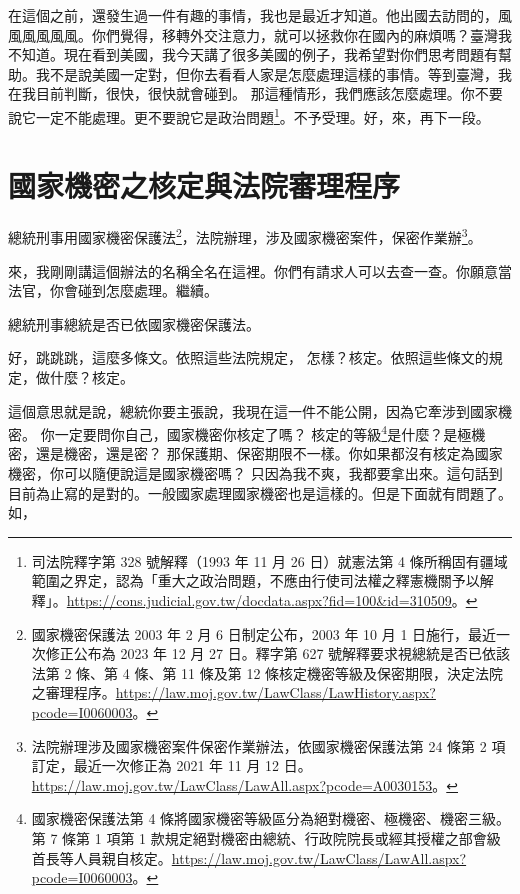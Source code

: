\hypertarget{c11:cue:230}{}在這個之前，還發生過一件有趣的事情，我也是最近才知道。他出國去訪問的，風風風風風風。你們覺得，移轉外交注意力，就可以拯救你在國內的麻煩嗎？臺灣我不知道。現在看到美國，我今天講了很多美國的例子，我希望對你們思考問題有幫助。我不是說美國一定對，但你去看看人家是怎麼處理這樣的事情。等到臺灣，我在我目前判斷，很快，很快就會碰到。
\hypertarget{c11:cue:231}{}那這種情形，我們應該怎麼處理。你不要說它一定不能處理。更不要說它是政治問題\footnote{司法院釋字第 328 號解釋（1993 年 11 月 26 日）就憲法第 4 條所稱固有疆域範圍之界定，認為「重大之政治問題，不應由行使司法權之釋憲機關予以解釋」。\url{https://cons.judicial.gov.tw/docdata.aspx?fid=100&id=310509}。}。不予受理。好，來，再下一段。

\section{國家機密之核定與法院審理程序}

\hypertarget{c11:cue:232}{}總統刑事用國家機密保護法\footnote{國家機密保護法 2003 年 2 月 6 日制定公布，2003 年 10 月 1 日施行，最近一次修正公布為 2023 年 12 月 27 日。釋字第 627 號解釋要求視總統是否已依該法第 2 條、第 4 條、第 11 條及第 12 條核定機密等級及保密期限，決定法院之審理程序。\url{https://law.moj.gov.tw/LawClass/LawHistory.aspx?pcode=I0060003}。}，法院辦理，涉及國家機密案件，保密作業辦\footnote{法院辦理涉及國家機密案件保密作業辦法，依國家機密保護法第 24 條第 2 項訂定，最近一次修正為 2021 年 11 月 12 日。\url{https://law.moj.gov.tw/LawClass/LawAll.aspx?pcode=A0030153}。}。

\hypertarget{c11:cue:233}{}來，我剛剛講這個辦法的名稱全名在這裡。你們有請求人可以去查一查。你願意當法官，你會碰到怎麼處理。繼續。

\hypertarget{c11:cue:234}{}總統刑事總統是否已依國家機密保護法。

\hypertarget{c11:cue:235}{}好，跳跳跳，這麼多條文。依照這些法院規定，
\hypertarget{c11:cue:236}{}怎樣？核定。依照這些條文的規定，做什麼？核定。

\hypertarget{c11:cue:237}{}這個意思就是說，總統你要主張說，我現在這一件不能公開，因為它牽涉到國家機密。
\hypertarget{c11:cue:238}{}你一定要問你自己，國家機密你核定了嗎？
\hypertarget{c11:cue:239}{}核定的等級\footnote{國家機密保護法第 4 條將國家機密等級區分為絕對機密、極機密、機密三級。第 7 條第 1 項第 1 款規定絕對機密由總統、行政院院長或經其授權之部會級首長等人員親自核定。\url{https://law.moj.gov.tw/LawClass/LawAll.aspx?pcode=I0060003}。}是什麼？是極機密，還是機密，還是密？
\hypertarget{c11:cue:240}{}那保護期、保密期限不一樣。你如果都沒有核定為國家機密，你可以隨便說這是國家機密嗎？
\hypertarget{c11:cue:241}{}只因為我不爽，我都要拿出來。這句話到目前為止寫的是對的。一般國家處理國家機密也是這樣的。但是下面就有問題了。如，

